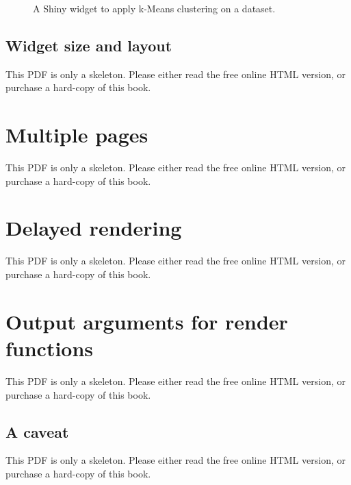 \documentclass[
  11pt,
]{krantz}
\theoremstyle{definition}
\theoremstyle{definition}
\theoremstyle{definition}
\theoremstyle{definition}
\theoremstyle{remark}
\begin{document}
\begin{figure}\caption{A Shiny widget to apply k-Means clustering on a dataset.}\end{figure}

\subsection{Widget size and layout}\label{widget-size-and-layout}

This PDF is only a skeleton. Please either read the free online HTML version, or purchase a hard-copy of this book.

\section{Multiple pages}\label{shiny-multiple}

This PDF is only a skeleton. Please either read the free online HTML version, or purchase a hard-copy of this book.

\section{Delayed rendering}\label{shiny-delay}

This PDF is only a skeleton. Please either read the free online HTML version, or purchase a hard-copy of this book.

\section{Output arguments for render functions}\label{shiny-args}

This PDF is only a skeleton. Please either read the free online HTML version, or purchase a hard-copy of this book.

\subsection{A caveat}\label{a-caveat}

This PDF is only a skeleton. Please either read the free online HTML version, or purchase a hard-copy of this book.
\end{document}
